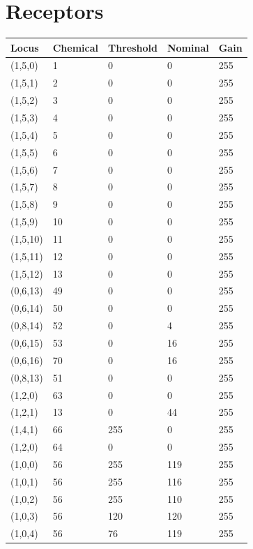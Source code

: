 \documentclass{article}
\begin{document}
\section*{Receptors}

\begin{longtable}{|p{2cm}|p{2cm}|p{2cm}|p{2cm}|p{2cm}|}
\hline
{\bf Locus} & {\bf Chemical} & {\bf Threshold} & {\bf Nominal} & {\bf Gain} \\ \hline
(1,5,0) & 1 & 0 & 0 & 255 \\ \hline
(1,5,1) & 2 & 0 & 0 & 255 \\ \hline
(1,5,2) & 3 & 0 & 0 & 255 \\ \hline
(1,5,3) & 4 & 0 & 0 & 255 \\ \hline
(1,5,4) & 5 & 0 & 0 & 255 \\ \hline
(1,5,5) & 6 & 0 & 0 & 255 \\ \hline
(1,5,6) & 7 & 0 & 0 & 255 \\ \hline
(1,5,7) & 8 & 0 & 0 & 255 \\ \hline
(1,5,8) & 9 & 0 & 0 & 255 \\ \hline
(1,5,9) & 10 & 0 & 0 & 255 \\ \hline
(1,5,10) & 11 & 0 & 0 & 255 \\ \hline
(1,5,11) & 12 & 0 & 0 & 255 \\ \hline
(1,5,12) & 13 & 0 & 0 & 255 \\ \hline
(0,6,13) & 49 & 0 & 0 & 255 \\ \hline
(0,6,14) & 50 & 0 & 0 & 255 \\ \hline
(0,8,14) & 52 & 0 & 4 & 255 \\ \hline
(0,6,15) & 53 & 0 & 16 & 255 \\ \hline
(0,6,16) & 70 & 0 & 16 & 255 \\ \hline
(0,8,13) & 51 & 0 & 0 & 255 \\ \hline
(1,2,0) & 63 & 0 & 0 & 255 \\ \hline
(1,2,1) & 13 & 0 & 44 & 255 \\ \hline
(1,4,1) & 66 & 255 & 0 & 255 \\ \hline
(1,2,0) & 64 & 0 & 0 & 255 \\ \hline
(1,0,0) & 56 & 255 & 119 & 255 \\ \hline
(1,0,1) & 56 & 255 & 116 & 255 \\ \hline
(1,0,2) & 56 & 255 & 110 & 255 \\ \hline
(1,0,3) & 56 & 120 & 120 & 255 \\ \hline
(1,0,4) & 56 & 76 & 119 & 255 \\ \hline

\end{longtable}
\end{document}
